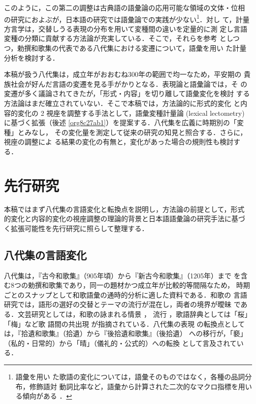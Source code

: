 \documentclass[submit]{ipsj}
\renewcommand{\ref}{\cref}
\begin{document}
このように，この第二の調整は古典語の語彙論の応用可能な領域の文体・位相
の研究におよぶが，日本語の研究では語彙論での実践が少ない\footnote{語彙を用い
た歌語の変化については，語彙そのものではなく，各種の品詞分布，修飾語対
動詞比率など，語彙から計算された二次的なマクロ指標を用いる傾向がある
\cite{tsuji1998Uta,nishihata1992Waka,hatano1941Waka}．}．対し
て，計量方言学は，交替しうる表現の分布を用いて変種間の違いを定量的に測
定し言語変種の分類に貢献する方法論が充実している．そこで，それらを参考
としつつ，勅撰和歌集の代表である八代集における変遷について，語彙を用い
た計量分析を検討する．

本稿が扱う八代集は，成立年がおおむね300年の範囲で均一なため，平安期の
貴族社会が好んだ言語の変遷を見る手がかりとなる．表現論と語彙論では，そ
の変遷が多く議論されてきたが，「形式・内容」を切り離して語彙変化を検討
する方法論はまだ確立されていない．そこで本稿では，方法論的に形式的変化
と内容的変化の 2 視座を調整する手法として，語彙変種計量論 (lexical
lectometry) \cite{Speelman2003Profilebased} に基づく拡張（後述
\ref{org8c27ab1}）を提案する．八代集を広義に時期別の「変種」とみなし，
その変化量を測定して従来の研究の知見と照合する．さらに，視座の調整によ
る結果の変化の有無と，変化があった場合の規則性も検討する．
\section{先行研究\label{org81155a1}}
\label{sec:orgd60423f}
本稿ではまず八代集の言語変化と転換点を説明し，方法論の前提として，形式
的変化と内容的変化の視座調整の理論的背景と日本語語彙論の研究手法に基づ
く拡張可能性を先行研究に照らして整理する．
\subsection{八代集の言語変化\label{orgaadbf41}}
\label{sec:orgad452ea}
八代集は，『古今和歌集』（905年頃）から『新古今和歌集』（1205年）まで
を含む8つの勅撰和歌集であり，同一の題材かつ成立年が比較的等間隔なため，
時期ごとのスナップとして和歌語彙の通時的分析に適した資料である．和歌の
言語研究では，語形の選好の交替とテーマの流行が混在し，両者の境界が曖昧
である．文芸研究としては，和歌の詠まれる情景 \cite{ueno1976Koshui}，
流行 \cite{kawamura1991Sekkan}，歌語辞典としては「桜」「梅」など歌
語間の共出現 \cite{katagiri1983Uta} が指摘されている．八代集の表現
の転換点としては，『拾遺和歌集』（拾遺）から『後拾遺和歌集』（後拾遺）
への移行が，「褻」（私的・日常的）から「晴」（儀礼的・公式的）への転換
として言及されている\cite{ueno1976Koshui,kawamura1991Sekkan}．
\end{document}
